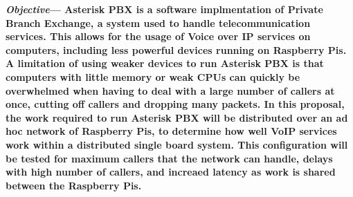 \bfseries\textit{Objective}---\relax 
	Asterisk PBX is a software implmentation of Private Branch Exchange, a system used to handle telecommunication services. This allows for the usage of Voice over IP services on computers, including less powerful devices running on Raspberry Pis.	A limitation of using weaker devices to run Asterisk PBX is that computers with little memory or weak CPUs can quickly be overwhelmed when having to deal with a large number of callers at once, cutting off callers and dropping many packets.	In this proposal, the work required to run Asterisk PBX will be distributed over an ad hoc network of Raspberry Pis, to determine how well VoIP services work within a distributed single board system.	This configuration will be tested for maximum callers that the network can handle, delays with high number of callers, and increaed latency as work is shared between the Raspberry Pis.